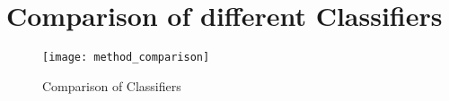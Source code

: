 \documentclass[../statistical_learning_notes.tex]{subfiles}
\begin{document}
\section{Comparison of different Classifiers}
    \begin{figure}[h]
        \texttt{[image: method\_comparison]}
        \centering
        \caption {Comparison of Classifiers}
        \label{fig:classifier_comparison} %
    \end{figure}
\end{document}
